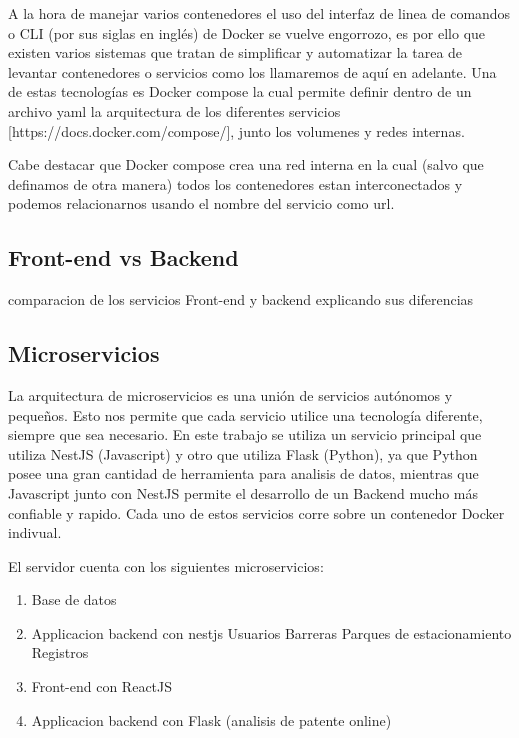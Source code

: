 A la hora de manejar varios contenedores el uso del interfaz de linea de comandos o CLI (por sus siglas en inglés) de Docker se vuelve engorrozo, es por ello que existen varios sistemas que tratan de simplificar y automatizar la tarea de levantar contenedores o servicios como los llamaremos de aquí en adelante. Una de estas tecnologías es Docker compose la cual permite definir dentro de un archivo yaml la arquitectura de los diferentes servicios [https://docs.docker.com/compose/], junto los volumenes y redes internas.

Cabe destacar que Docker compose crea una red interna en la cual (salvo que definamos de otra manera) todos los contenedores estan interconectados y podemos relacionarnos usando el nombre del servicio como url.

\subsection{Front-end vs Backend}

comparacion de los servicios Front-end y backend explicando sus diferencias


\subsection{Microservicios}

La arquitectura de microservicios es una unión de servicios autónomos y pequeños. Esto nos permite que cada servicio utilice una tecnología diferente, siempre que sea necesario. En este trabajo se utiliza un servicio principal que utiliza NestJS (Javascript) y otro que utiliza Flask (Python), ya que Python posee una gran cantidad de herramienta para analisis de datos, mientras que Javascript junto con NestJS permite el desarrollo de un Backend mucho más confiable y rapido. Cada uno de estos servicios corre sobre un contenedor Docker indivual.

El servidor cuenta con los siguientes microservicios:

\begin{enumerate}
    \item Base de datos
    \item Applicacion backend con nestjs
          \subitem Usuarios
          \subitem Barreras
          \subitem Parques de estacionamiento
          \subitem Registros
    \item Front-end con ReactJS
    \item Applicacion backend con Flask (analisis de patente online)
\end{enumerate}


